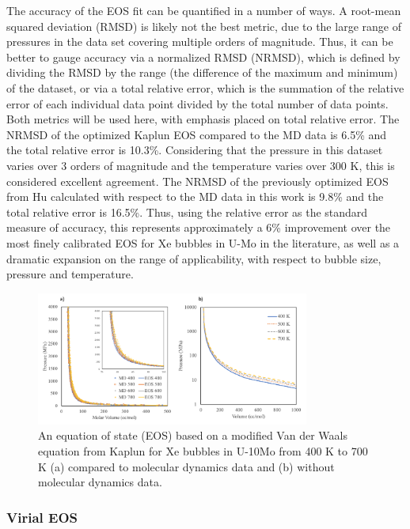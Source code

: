 \documentclass[review]{elsarticle}
\begin{document}
The accuracy of the EOS fit can be quantified in a number of ways. A root-mean squared deviation (RMSD) is likely not the best metric, due to the large range of pressures in the data set covering multiple orders of magnitude. Thus, it can be better to gauge accuracy via a normalized RMSD (NRMSD), which is defined by dividing the RMSD by the range (the difference of the maximum and minimum) of the dataset, or via a total relative error, which is the summation of the relative error of each individual data point divided by the total number of data points. Both metrics will be used here, with emphasis placed on total relative error. The NRMSD of the optimized Kaplun EOS compared to the MD data is 6.5\% and the total relative error is 10.3\%. Considering that the pressure in this dataset varies over 3 orders of magnitude and the temperature varies over 300 K, this is considered excellent agreement. The NRMSD of the previously optimized EOS from Hu calculated with respect to the MD data in this work is 9.8\% and the total relative error is 16.5\%. Thus, using the relative error as the standard measure of accuracy, this represents approximately a 6\% improvement over the most finely calibrated EOS for Xe bubbles in U-Mo in the literature, as well as a dramatic expansion on the range of applicability, with respect to bubble size, pressure and temperature. 

\begin{figure}[h]
 \centering
 \includegraphics[width=0.8\textwidth]{7_xe_eosK.png} 
 \caption{An equation of state (EOS) based on a modified Van der Waals equation from Kaplun for Xe bubbles in U-10Mo from 400 K to 700 K (a) compared to molecular dynamics data and (b) without molecular dynamics data. }
 \label{fig:xe_eosK}
\end{figure}


\subsubsection{Virial EOS}
\end{document}
